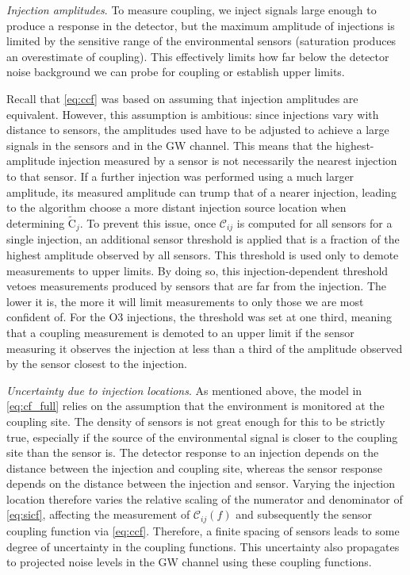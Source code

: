 \textit{Injection amplitudes}. To measure coupling, we inject signals large enough to produce a response in the detector, but the maximum amplitude of injections is limited by the sensitive range of the environmental sensors (saturation produces an overestimate of coupling).
This effectively limits how far below the detector noise background we can probe for coupling or establish upper limits.

Recall that \cref{eq:ccf} was based on assuming that injection amplitudes are equivalent.
However, this assumption is ambitious: since injections vary with distance to sensors, the amplitudes used have to be adjusted to achieve a large signals in the sensors and in the \ac{GW} channel.
This means that the highest-amplitude injection measured by a sensor is not necessarily the nearest injection to that sensor.
If a further injection was performed using a much larger amplitude, its measured amplitude can trump that of a nearer injection, leading to the algorithm choose a more distant injection source location when determining $\widetilde{\mathrm{C}}_j$.
To prevent this issue, once $\mathcal{C}_{ij}$ is computed for all sensors for a single injection, an additional sensor threshold is applied that is a fraction of the highest amplitude observed by all sensors.
This threshold is used only to demote measurements to upper limits.
By doing so, this injection-dependent threshold vetoes measurements produced by sensors that are far from the injection.
The lower it is, the more it will limit measurements to only those we are most confident of.
For the \ac{O3} injections, the threshold was set at one third, meaning that a coupling measurement is demoted to an upper limit if the sensor measuring it observes the injection at less than a third of the amplitude observed by the sensor closest to the injection.

\textit{Uncertainty due to injection locations}.
As mentioned above, the model in \cref{eq:cf_full} relies on the assumption that the environment is monitored at the coupling site.
The density of sensors is not great enough for this to be strictly true, especially if the source of the environmental signal is closer to the coupling site than the sensor is.
The detector response to an injection depends on the distance between the injection and coupling site, whereas the sensor response depends on the distance between the injection and sensor.
Varying the injection location therefore varies the relative scaling of the numerator and denominator of \cref{eq:sicf}, affecting the measurement of $\mathcal{C}_{ij}(f)$ and subsequently the sensor coupling function via \cref{eq:ccf}.
Therefore, a finite spacing of sensors leads to some degree of uncertainty in the coupling functions.
This uncertainty also propagates to projected noise levels in the \ac{GW} channel using these coupling functions.


